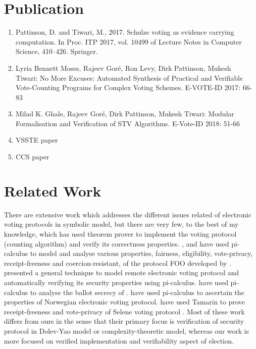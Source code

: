 \section{Publication}
	\begin{enumerate}
	\item Pattinson, D. and Tiwari, M., 2017. Schulze voting as evidence carrying computation. In Proc. 
	ITP 2017, vol. 10499 of Lecture Notes in Computer Science, 410–426. Springer. 
	\item Lyria Bennett Moses, Rajeev Goré, Ron Levy, Dirk Pattinson, Mukesh Tiwari:
	No More Excuses: Automated Synthesis of Practical and Verifiable Vote-Counting Programs for Complex 
	Voting 	Schemes. E-VOTE-ID 2017: 66-83
	\item Milad K. Ghale, Rajeev Goré, Dirk Pattinson, Mukesh Tiwari:
	Modular Formalisation and Verification of STV Algorithms. E-Vote-ID 2018: 51-66
	\item VSSTE paper
	\item CCS paper

	\end{enumerate}




\section{Related Work}
 There are extensive work which 
 addresses the different issues related of electronic voting protocols  in symbolic model, 
 but there are very few, to the best of my knowledge, 
 which has used theorem prover to implement the voting protocol (counting algorithm)
 and verify its correctness properties. 
 \cite{10.1007/978-3-540-31987-0_14}, and  \cite{Delaune2010} have used pi-calculus to model 
 and analyse various properties, fairness, eligibility, vote-privacy, receipt-freeness and coercion-resistant,  
 of the protocol FOO developed by \cite{10.1007/3-540-57220-1_66}.  \cite{Backes:2008:AVR:1380848.1381255}
 presented a general technique to model  remote electronic 
 voting protocol and automatically verifying  its security properties using pi-calculus. 
 \cite{5992139} have used pi-calculus to analyse the ballot secrecy of \cite{Helios:2016:HVS}.
 \cite{10.1007/978-3-642-28641-4_7} have used pi-calculus to ascertain the properties of 
 Norwegian electronic voting protocol.
 \cite{10.1007/978-3-319-68687-5_7} have used Tamarin  to prove receipt-freeness 
 and vote-privacy of Selene voting protocol \citep{Selene}.  Most of these work differs from ours
 in the sense that their primary focus is verification of security protocol in  
 Dolev-Yao model or  complexity-theoretic model, whereas our work is 
 more focused on verified implementation and  verifiability  aspect of election.

